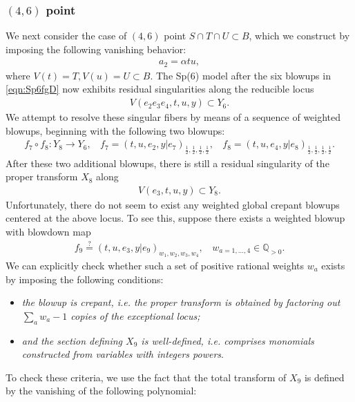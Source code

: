\documentclass[11pt,oneside,english]{article}
\numberwithin{equation}{section}
\theoremstyle{definition}
\begin{document}
\subsubsection{$(4,6)$ point}
We next consider the case of $(4,6)$ point $S\cap T \cap U \subset B$, which we construct by imposing the following vanishing behavior:
	\begin{align}
		a_2 = \alpha  t u,
	\end{align}
where $V(t)=T, V(u )=U \subset B$. The Sp(6) model after the six blowups in \cref{eqn:Sp6fgD} now exhibits residual singularities along the reducible locus
	\begin{align}
	\label{eqn:singX6}
		V(e_2 e_3 e_4 , t ,u ,y) \subset Y_6.
	\end{align}
We attempt to resolve these singular fibers by means of a sequence of weighted blowups, beginning with the following two blowups:
	\begin{align}
	\label{eqn:Sp6extratwo}
		f_7 \circ f_8: Y_8 \rightarrow Y_6,~~~~ f_7 = (t,u,e_2,y|e_7)_{\frac{1}{2}, \frac{1}{2},\frac{1}{2},\frac{1}{2}},~~~~ f_8 = (t,u,e_4,y|e_8)_{\frac{1}{2},\frac{1}{2},\frac{1}{2},\frac{1}{2}}.
	\end{align}
After these two additional blowups, there is still a residual singularity of the proper transform $X_8$ along
	\begin{align}
		V(e_3, t , u , y )\subset Y_8.
	\end{align}	
Unfortunately, there do not seem to exist any weighted global crepant blowups centered at the above locus. To see this, suppose there exists a weighted blowup with blowdown map
	\begin{align}
		f_9 \overset{\text{?}}{=} (t,u,e_3,y|e_9)_{w_1,w_2,w_3,w_4},~~~~ w_{a=1,\dots,4} \in \mathbb Q_{>0}.
	\end{align}
We can explicitly check whether such a set of positive rational weights $w_a$ exists by imposing the following conditions:
	\begin{itemize}
		\item \emph{the blowup is crepant, i.e. the proper transform is obtained by factoring out $\sum_a w_a -1 $ copies of the exceptional locus;}
		\item \emph{and the section defining $X_9$ is well-defined, i.e. comprises monomials constructed from variables with integers powers}. 
	\end{itemize} 
To check these criteria, we use the fact that the total transform of $X_9$ is defined by the vanishing of the following polynomial:
\end{document}
